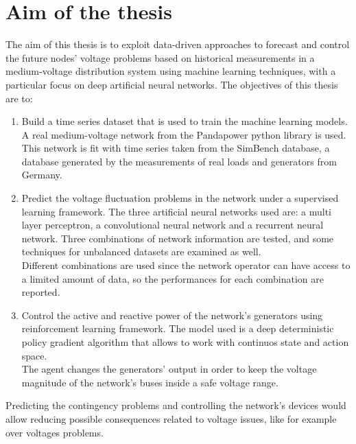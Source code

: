 
\section{Aim of the thesis}
The aim of this thesis is to exploit data-driven approaches to forecast and control the future nodes' voltage problems based on historical measurements in a medium-voltage distribution system using machine learning techniques, with a particular focus on deep artificial neural networks. The objectives of this thesis are to:
\begin{enumerate}[label=\textbf{\Roman*)}]
    \item \label{aim1}  Build a time series dataset that is used to train the machine learning models. A real medium-voltage network from the Pandapower python library is used. This network is fit with time series taken from the SimBench database, a database generated by the measurements of real loads and generators from Germany. 
    
    \item \label{aim2} Predict the voltage fluctuation problems in the network under a supervised learning framework. The three artificial neural networks used are: a multi layer perceptron, a convolutional neural network and a recurrent neural network. Three combinations of network information are tested, and some techniques for unbalanced datasets are examined as well. \\
    Different combinations are used since the network operator can have access to a limited amount of data, so the performances for each combination are reported.
    
    \item \label{aim3} Control the active and reactive power of the network's generators using reinforcement learning framework. The model used is a deep deterministic policy gradient algorithm that allows to work with continuos state and action space.\\
    The agent changes the generators' output in order to keep the voltage magnitude of the network's buses inside a safe voltage range.
\end{enumerate}
Predicting the contingency problems and controlling the network's devices would allow reducing possible consequences related to voltage issues, like for example over voltages problems. 


